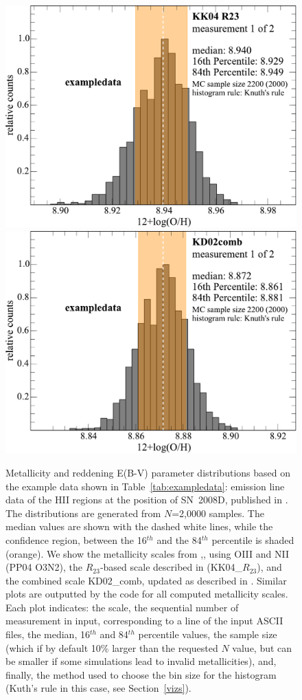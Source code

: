 \documentclass{emulateapj}
\begin{document}
\begin{figure}[!ht]
\centerline{
\includegraphics[width=0.98\columnwidth]{exampledata_n2000_KK04_R23_1.pdf}
\includegraphics[width=0.98\columnwidth]{exampledata_n2000_KD02comb_1.pdf}}
\caption{Metallicity and reddening E(B-V) parameter distributions based on the example data shown in Table~\ref{tab:exampledata}: emission line data of the HII regions at the position of SN~2008D, published in \citet{modjaz11}. The distributions are generated from $N$=2,0000 samples. The median values are shown with the dashed white lines, while the confidence region, between the 16$^{th}$ and the 84$^{th}$ percentile is shaded (orange). We show the metallicity scales from ,\citet{pettini04}, using OIII and NII  (PP04 O3N2), the $R_{23}$-based scale described in \citet{kobulnicky04} (KK04\_$R_{23}$), and the combined scale KD02\_comb, updated as described in  \citet{kewley08}. Similar plots are outputted by the code for all computed metallicity scales. Each plot indicates: the scale, the sequential number of measurement in input, corresponding to a line of the input ASCII files, the median, 16$^{th}$  and 84$^{th}$  percentile values, the sample size (which if by default 10\% larger than the requested $N$ value, but can be smaller if some simulations lead to invalid metallicities), and, finally, the method used to choose the bin size for the histogram (Kuth's rule in this case, see Section~\ref{vizs}).}

\end{figure}
\end{document}
